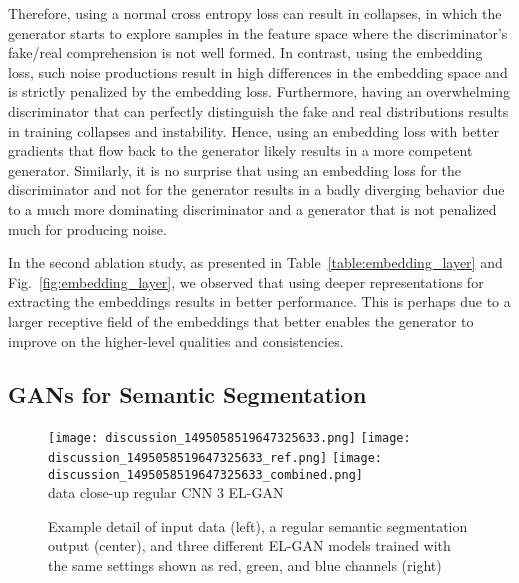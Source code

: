 \documentclass{article} \usepackage{nips13submit_e,times}
\newcommand{\elgan}{\mbox{EL-GAN}}
\begin{document}
Therefore, using a normal cross entropy loss can result in collapses, in which the generator starts to explore samples in the feature space where the discriminator's fake/real comprehension is not well formed. 
In contrast, using the embedding loss, such noise productions result in high differences in the embedding space and is strictly penalized by the embedding loss.
Furthermore, having an overwhelming discriminator that can perfectly distinguish the fake and real distributions results in training collapses and instability.
Hence, using an embedding loss with better gradients that flow back to the generator likely results in a more competent generator.
Similarly, it is no surprise that using an embedding loss for the discriminator and not for the generator results in a badly diverging behavior due to a much more dominating discriminator and a generator that is not penalized much for producing noise.

In the second ablation study, as presented in Table~\ref{table:embedding_layer} and Fig.~\ref{fig:embedding_layer}, we observed that using deeper representations for extracting the embeddings results in better performance.
This is perhaps due to a larger receptive field of the embeddings that better enables the generator to improve on the higher-level qualities and consistencies.

\subsection{GANs for Semantic Segmentation}

\begin{figure}[!t]
  \centering
  \texttt{[image: discussion\_1495058519647325633.png]}
  \texttt{[image: discussion\_1495058519647325633\_ref.png]}
  \texttt{[image: discussion\_1495058519647325633\_combined.png]}
  \\
  {data close-up \hspace{1em} regular CNN \hspace{1em} 3 \elgan{}}
  \caption{Example detail of input data (left), a regular semantic segmentation output (center), and three different \elgan{} models trained with the same settings shown as red, green, and blue channels (right)}
  \label{fig:discussion_illustration}
\end{figure}
\end{document}
